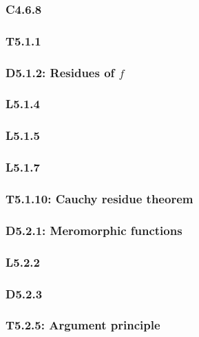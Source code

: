 \documentclass{article}
\begin{document}
\begin{multicols*}{3}
\subsubsection*{C4.6.8}

\newcolumn

\subsubsection*{T5.1.1}

\subsubsection*{D5.1.2: Residues of $f$}

\subsubsection*{L5.1.4}

\subsubsection*{L5.1.5}

\subsubsection*{L5.1.7}

\subsubsection*{T5.1.10: Cauchy residue theorem}

\newcolumn

\subsubsection*{D5.2.1: Meromorphic functions}

\subsubsection*{L5.2.2}

\subsubsection*{D5.2.3}

\subsubsection*{T5.2.5: Argument principle}


\end{multicols*}
\end{document}
